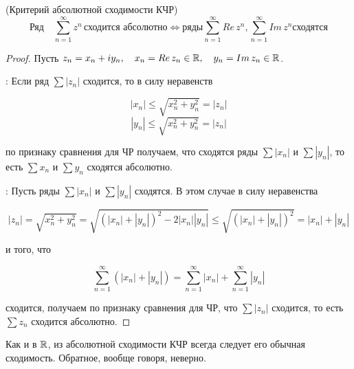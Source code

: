 \documentclass[../../main.tex]{subfiles}
\begin{document}
\begin{thm}(Критерий абсолютной сходимости КЧР)
	\[\text{Ряд} \quad \sum_{n=1}^{\infty}z^n\, \text{сходится абсолютно} \iff \text{ряды} \sum_{n=1}^{\infty}Re\,z^n, \sum_{n=1}^{\infty}Im\,z^n \text{сходятся}\]
\end{thm}
\begin{proof}
	Пусть $ z_n = x_n + iy_n, \quad x_n = Re\,z_n \in \mathbb{R}, \quad y_n = Im\,z_n \in \mathbb{R} $.
	
	\nec: Если ряд $ \sum |z_n| $ сходится, то в силу неравенств
	
	\[|x_n| \leq \sqrt{x_n^2 + y_n^2} = |z_n|\]
	\[|y_n| \leq \sqrt{x_n^2 + y_n^2} = |z_n|\]
	
	по признаку сравнения для ЧР получаем, что сходятся ряды $ \sum |x_n| $ и $ \sum |y_n| $, то есть $ \sum x_n $ и $ \sum y_n $ сходятся абсолютно.
	
	\suff: Пусть ряды $ \sum |x_n| $ и $ \sum |y_n| $ сходятся. В этом случае в силу неравенства
	
	\[|z_n| = \sqrt{x_n^2 + y_n^2} = \sqrt{(|x_n| + |y_n|)^2 - 2|x_n||y_n|} \leq \sqrt{(|x_n| + |y_n|)^2} = |x_n| + |y_n|\]
	
	и того, что
	
	\[\sum_{n=1}^{\infty}(|x_n| + |y_n|) = \sum_{n=1}^{\infty}|x_n| + \sum_{n=1}^{\infty}|y_n|\]
	
	сходится, получаем по признаку сравнения для ЧР, что $ \sum |z_n| $ сходится, то есть  $ \sum z_n $ сходится абсолютно.
\end{proof}

\begin{rem}
	Как и в $ \mathbb{R} $, из абсолютной сходимости КЧР всегда следует его обычная сходимость. Обратное, вообще говоря, неверно.
\end{rem}
\end{document}
